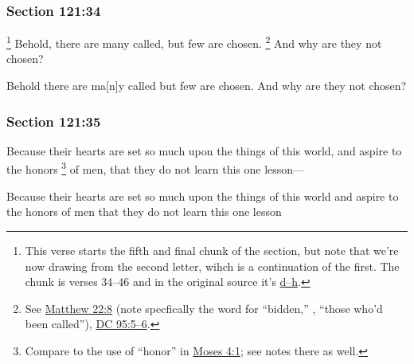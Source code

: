 	\subsubsection{Section 121:34} %
		\label{DC121-34}

			\footnote{%
				This verse starts the fifth and final chunk of the section, but note that we're now drawing from the second letter, wihch is a continuation of the first. The chunk is verses 34--46 and in the original source it's \hyperlink{EMS-1839-JS-CIR-22-MAR-1839-d}{d--h}.
				}%
		Behold, there are many called, but few are chosen.%
			\footnote{%
				See \hyperref[MATTHEW-22-8]{Matthew 22:8} (note specfically the word for ``bidden,'' , ``those who'd been called''), \hyperref[DC95-5]{DC 95:5--6}.
				} 
		And why are they not chosen?

		\begin{framed}
		\scriptsize
			\begin{compactdesc}
				\item[JSP] Behold there are ma[n]y called but few are chosen. And why are they not chosen?
			\end{compactdesc}
		\end{framed}

	\subsubsection{Section 121:35} %
		\label{DC121-35}

		Because their hearts are set so much upon the things of this world, and aspire to the honors%
			\footnote{%
				Compare to the use of ``honor'' in \hyperref[MOSES-4-1]{Moses 4:1}; see notes there as well.
				}
		of men, that they do not learn this one lesson---

		\begin{framed}
		\scriptsize
			\begin{compactdesc}
				\item[JSP] Because their hearts are set so much upon the things of this world and aspire to the honors of men that they do not learn this one lesson
			\end{compactdesc}
		\end{framed}

